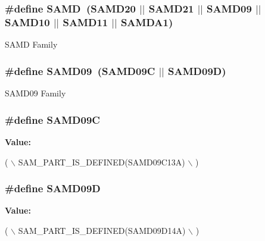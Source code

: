 \subsubsection[{S\+A\+M\+D}]{\setlength{\rightskip}{0pt plus 5cm}\#define S\+A\+M\+D~({\bf S\+A\+M\+D20} $\vert$$\vert$ {\bf S\+A\+M\+D21} $\vert$$\vert$ {\bf S\+A\+M\+D09} $\vert$$\vert$ {\bf S\+A\+M\+D10} $\vert$$\vert$ {\bf S\+A\+M\+D11} $\vert$$\vert$ {\bf S\+A\+M\+D\+A1})}\label{group__sam__part__macros__group_ga5eed5c828e076621e5274450cdc6c32b}
S\+A\+M\+D Family \hypertarget{group__sam__part__macros__group_gafca3f645579e1a67ce865408ecb5269f}{}
\subsubsection[{S\+A\+M\+D09}]{\setlength{\rightskip}{0pt plus 5cm}\#define S\+A\+M\+D09~(S\+A\+M\+D09\+C $\vert$$\vert$ S\+A\+M\+D09\+D)}\label{group__sam__part__macros__group_gafca3f645579e1a67ce865408ecb5269f}
S\+A\+M\+D09 Family \hypertarget{group__sam__part__macros__group_gae85ddac6159db51e09555ec6150a6947}{}
\subsubsection[{S\+A\+M\+D09\+C}]{\setlength{\rightskip}{0pt plus 5cm}\#define S\+A\+M\+D09\+C}\label{group__sam__part__macros__group_gae85ddac6159db51e09555ec6150a6947}
{\bfseries Value\+:}
\begin{DoxyCode}
( \(\backslash\)
        SAM\_PART\_IS\_DEFINED(SAMD09C13A) \(\backslash\)
    )
\end{DoxyCode}
\hypertarget{group__sam__part__macros__group_ga8209c68b3303de59159dcc7ace291b99}{}
\subsubsection[{S\+A\+M\+D09\+D}]{\setlength{\rightskip}{0pt plus 5cm}\#define S\+A\+M\+D09\+D}\label{group__sam__part__macros__group_ga8209c68b3303de59159dcc7ace291b99}
{\bfseries Value\+:}
\begin{DoxyCode}
( \(\backslash\)
        SAM\_PART\_IS\_DEFINED(SAMD09D14A) \(\backslash\)
    )
\end{DoxyCode}
\hypertarget{group__sam__part__macros__group_gac83f6794433f2c57bfc5c520fe3d67ce}{}
